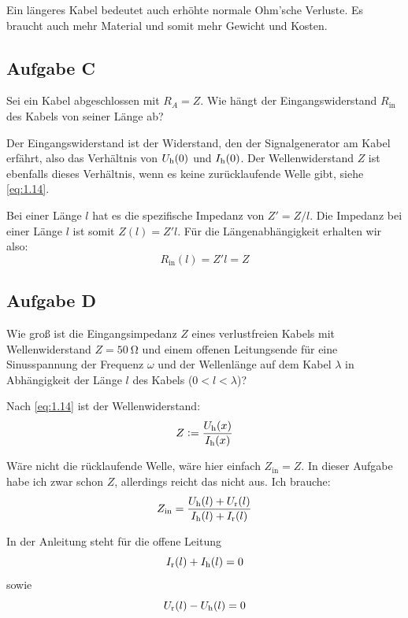 Ein längeres Kabel bedeutet auch erhöhte normale Ohm'sche Verluste. Es braucht
auch mehr Material und somit mehr Gewicht und Kosten.

\subsection{Aufgabe C}

\begin{problem}
	Sei ein Kabel abgeschlossen mit $R_A = Z$. Wie hängt der Eingangswiderstand
	$R_\text{in}$ des Kabels von seiner Länge ab?
\end{problem}

Der Eingangswiderstand ist der Widerstand, den der Signalgenerator am Kabel
erfährt, also das Verhältnis von $U_\text h(0)$ und $I_\text h(0)$. Der
Wellenwiderstand $Z$ ist ebenfalls dieses Verhältnis, wenn es keine
zurücklaufende Welle gibt, siehe \eqref{eq:1.14}.

Bei einer Länge $l$ hat es die spezifische Impedanz von $Z' = Z/l$. Die
Impedanz bei einer Länge $l$ ist somit $Z(l) = Z' l$. Für die
Längenabhängigkeit erhalten wir also:
\[
	R_\text{in}(l) = Z' l = Z
\]

\subsection{Aufgabe D}

\begin{problem}
	Wie groß ist die Eingangsimpedanz $Z$ eines verlustfreien Kabels mit
	Wellenwiderstand $Z = \SI{50}\ohm$ und einem offenen Leitungsende für eine
	Sinusspannung der Frequenz $\omega$ und der Wellenlänge auf dem Kabel
	$\lambda$ in Abhängigkeit der Länge $l$ des Kabels ($0 < l < \lambda$)?
\end{problem}

Nach \eqref{eq:1.14} ist der Wellenwiderstand:
\begin{equation}
	\label{eq:D1}
	Z := \frac{U_\text h(x)}{I_\text h(x)}
\end{equation}

Wäre nicht die rücklaufende Welle, wäre hier einfach $Z_\text{in} = Z$. In
dieser Aufgabe habe ich zwar schon $Z$, allerdings reicht das nicht aus. Ich
brauche:
\begin{equation}
	\label{eq:D2}
	Z_\text{in}
	= \frac{U_\text h (l) + U_\text r (l)}{I_\text h (l) + I_\text r (l)}
\end{equation}

In der Anleitung steht für die offene Leitung
\[
	I_\text r(l) + I_\text h(l) = 0
\]
sowie
\[
	U_\text r(l) - U_\text h(l) = 0
\]

